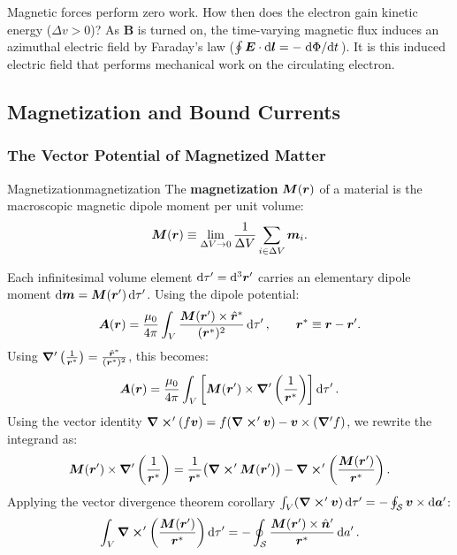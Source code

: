 \begin{remark}
    Magnetic forces perform zero work. How then does the electron gain kinetic energy ($\Delta v > 0$)? As $\bm{B}$ is turned on, the time-varying magnetic flux induces an azimuthal electric field by Faraday's law ($\oint \bm{E}\cdot \dd{\bm{l}} = -\dv*{\Phi}{t}$). It is this induced electric field that performs mechanical work on the circulating electron.
\end{remark}

\subsection{Magnetization and Bound Currents}

\subsubsection{The Vector Potential of Magnetized Matter}

\begin{definition}{Magnetization}{magnetization}
    The \textbf{magnetization} $\bm{M}(\bm{r})$ of a material is the macroscopic magnetic dipole moment per unit volume:
    \begin{equation}
        \bm{M}(\bm{r}) \equiv \lim_{\Delta V \to 0} \frac{1}{\Delta V} \sum_{i \in \Delta V} \bm{m}_i.
    \end{equation}
\end{definition}

Each infinitesimal volume element $\dd{\tau'} = \dd[3]{\bm{r}'}$ carries an elementary dipole moment $\dd{\bm{m}} = \bm{M}(\bm{r}')\dd{\tau'}$. Using the dipole potential:
\begin{equation}
    \bm{A}(\bm{r}) = \frac{\mu_0}{4\pi} \int_V \frac{\bm{M}(\bm{r}')\times \hat{\bm{r}}^*}{(\bm{r}^*)^2} \dd{\tau'}, \qquad \bm{r}^* \equiv \bm{r} - \bm{r}'.
\end{equation}
Using $\grad'\left(\frac{1}{\bm{r}^*}\right) = \frac{\hat{\bm{r}}^*}{(\bm{r}^*)^2}$, this becomes:
\begin{equation}
    \bm{A}(\bm{r}) = \frac{\mu_0}{4\pi} \int_V \left[ \bm{M}(\bm{r}') \times \grad'\left(\frac{1}{\bm{r}^*}\right) \right] \dd{\tau'}.
\end{equation}
Using the vector identity $\curl'(f \bm{v}) = f(\curl' \bm{v}) - \bm{v}\times(\grad' f)$, we rewrite the integrand as:
\begin{equation}
    \bm{M}(\bm{r}') \times \grad'\left(\frac{1}{\bm{r}^*}\right) = \frac{1}{\bm{r}^*} \big(\curl' \bm{M}(\bm{r}')\big) - \curl'\left( \frac{\bm{M}(\bm{r}')}{\bm{r}^*} \right).
\end{equation}
Applying the vector divergence theorem corollary $\int_V (\curl' \bm{v})\dd{\tau'} = -\oint_{\mathcal{S}} \bm{v}\times \dd{\bm{a}'}$:
\begin{equation}
    \int_V \curl'\left( \frac{\bm{M}(\bm{r}')}{\bm{r}^*} \right)\dd{\tau'} = -\oint_{\mathcal{S}} \frac{\bm{M}(\bm{r}')\times \hat{\bm{n}}'}{\bm{r}^*} \dd{a'}.
\end{equation}

